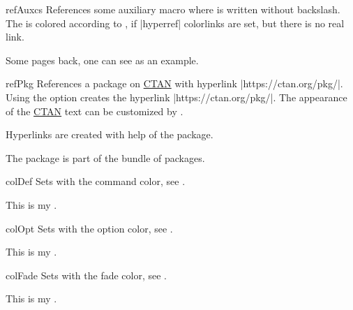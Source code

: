 \begin{docCommand}[doc updated=2020-02-11]{refAuxcs}{}
  References some auxiliary macro  where  is
  written without backslash.
  The  is colored according to ,
  if |hyperref| colorlinks are set, but there is no real link.
\begin{dispExample}
Some pages back, one can see  as an example.
\end{dispExample}
\end{docCommand}


\begin{docCommand}[doc new and updated={2024-09-18}{2024-11-29}]{refPkg}{}
  References a package  on \href{https://ctan.org}{CTAN} with
  hyperlink \mbox{|https://ctan.org/pkg/|}.
  Using the option  creates the hyperlink
  \mbox{|https://ctan.org/pkg/|}.
  The appearance of the \href{https://ctan.org}{CTAN} text can be
  customized by .
\begin{dispExample}
Hyperlinks are created with help of the  package.\par
The package  is part of the
 bundle of packages.
\end{dispExample}
\end{docCommand}


\clearpage

\begin{docCommand}{colDef}{}
Sets  with the command color, see .
\begin{dispExample}
This is my .
\end{dispExample}
\end{docCommand}

\begin{docCommand}{colOpt}{}
  Sets  with the option color, see .
\begin{dispExample}
This is my .
\end{dispExample}
\end{docCommand}

\begin{docCommand}[doc new=2019-09-18]{colFade}{}
  Sets  with the fade color, see .
\begin{dispExample}
This is my .
\end{dispExample}
\end{docCommand}


